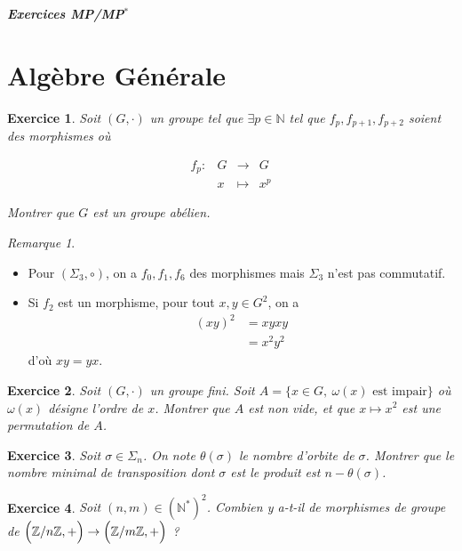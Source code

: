 \documentclass[12pt]{article}
\newtheorem{exercise}{Exercice}[section]
\theoremstyle{remark}
\theoremstyle{remark}
\newtheorem{remark}{Remarque}
\newcommand{\N}{\mathbb{N}}
\newcommand{\Z}{\mathbb{Z}}
\newcommand{\function}[5]{
	$$
	\begin{array}{rccl}
		#1: & #2 & \to & #3 \\
		& #4 & \mapsto & #5
	\end{array}
	$$
}
\begin{document}
\begin{titlepage}
	\centering
	\vspace*{\fill}
	\Huge \textit{\textbf{Exercices MP/MP$^*$}}
	\vspace*{\fill}
\end{titlepage}

\cleardoublepage

\tableofcontents

\cleardoublepage

\section{Algèbre Générale}

\begin{exercise}
	Soit $(G,\cdot)$ un groupe tel que $\exists p\in\N$ tel que
	$f_p,f_{p+1},f_{p+2}$ soient des morphismes où
	\function{f_p}{G}{G}{x}{x^p}
	Montrer que $G$ est un groupe abélien.
\end{exercise}

\begin{remark}
	\phantom{}
	\begin{itemize}
		\item Pour $(\Sigma_{3},\circ)$, on a $f_{0},f_{1},f_{6}$ des morphismes
		mais $\Sigma_{3}$ n'est pas commutatif.
		\item Si $f_{2}$ est un morphisme, pour tout $x,y\in G^2$, on a 
		\begin{align*}
			(xy)^{2}
			&=xy xy\\
			&=x^2y^2
		\end{align*}
		d'où $xy=yx$.
	\end{itemize}
\end{remark}

\begin{exercise}
	Soit $(G,\cdot)$ un groupe fini. Soit $A=\{x\in G,~\omega(x)\text{ est impair}\}$ où
	$\omega(x)$ désigne l'ordre de $x$. Montrer que $A$ est non vide, et que
	$x\mapsto x^2$ est une permutation de $A$.
\end{exercise}

\begin{exercise}
	Soit $\sigma\in\Sigma_n$. On note $\theta(\sigma)$ le nombre d'orbite de
	$\sigma$. Montrer que le nombre minimal de transposition dont $\sigma$ est
	le produit est $n-\theta(\sigma)$.
\end{exercise}

\begin{exercise}
	Soit $(n,m)\in(\N^*)^2$. Combien y a-t-il de morphismes de groupe de
	$\Bigl(\Z/n\Z, +\Bigr)\to\Bigl(\Z/m\Z, +\Bigr)$ ?
\end{exercise}
\end{document}
